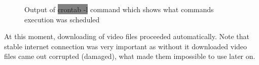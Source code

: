 \begin{enumerate}
\begin{figure}[H]
        \caption{Output of \colorbox{Gray}{crontab -l} command which shows what commands execution was scheduled}
        \label{fig:crontabList}
    \end{figure}
\end{enumerate}
At this moment, downloading of video files proceeded automatically. Note that stable internet connection was very important as without it downloaded video files came out corrupted (damaged), what made them impossible to use later on.

